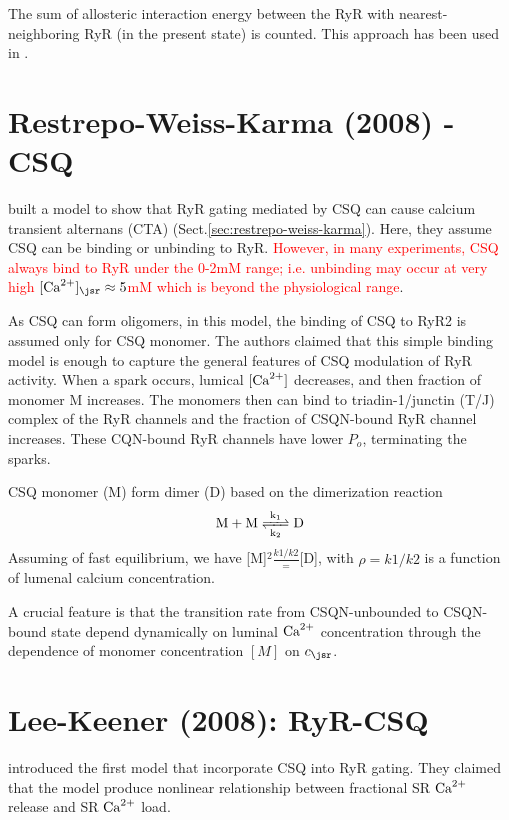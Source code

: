 The sum of allosteric interaction energy between the RyR with
nearest-neighboring RyR (in the present state) is counted. This approach has
been used in \citep{williams2011}.


\section{Restrepo-Weiss-Karma (2008) - CSQ}
\label{sec:RYR_Restrepo2008-CSQ}

\citep{restrepo2008cmm} built a model to show that RyR gating mediated by CSQ
can cause calcium transient alternans (CTA)
(Sect.\ref{sec:restrepo-weiss-karma}). Here, they assume CSQ can be binding or
unbinding to RyR. \textcolor{red}{However, in many experiments, CSQ always bind
to RyR under the 0-2mM range; i.e. unbinding may occur at very high
$[\Ca]_\jsr \approx 5$mM which is beyond the physiological range}.

As CSQ can form oligomers, in this model, the binding of CSQ to RyR2 is assumed
only for CSQ monomer. The authors claimed that this simple binding model is
enough to capture the general features of CSQ modulation of RyR activity. When
a spark occurs, lumical $[{\text{Ca}^{2+}}]$ decreases, and then fraction of monomer M
increases. The monomers then can bind to triadin-1/junctin (T/J) complex of the
RyR channels and the fraction of CSQN-bound RyR channel increases. These
CQN-bound RyR channels have lower $P_o$, terminating the sparks.

CSQ monomer (M) form dimer (D) based on the dimerization reaction
\begin{equation}
\ce{ M + M <=>[k_1][k_2] D}
\end{equation}
Assuming of fast equilibrium, we have [M]$^2 \frac{k1/k2}=$[D], with
$\rho=k1/k2$ is a function of lumenal calcium concentration.

A crucial feature is that the transition rate from CSQN-unbounded to CSQN-bound
state depend dynamically on luminal ${\text{Ca}^{2+}}$ concentration through the dependence
of monomer concentration $[M]$ on $c_\jsr$.

\section{Lee-Keener (2008): RyR-CSQ}
\label{sec:RyR_Lee2008}

\citep{Lee2008} introduced the first model that incorporate CSQ into RyR gating.
They claimed that the model produce nonlinear relationship between fractional SR
${\text{Ca}^{2+}}$ release and SR ${\text{Ca}^{2+}}$ load.

